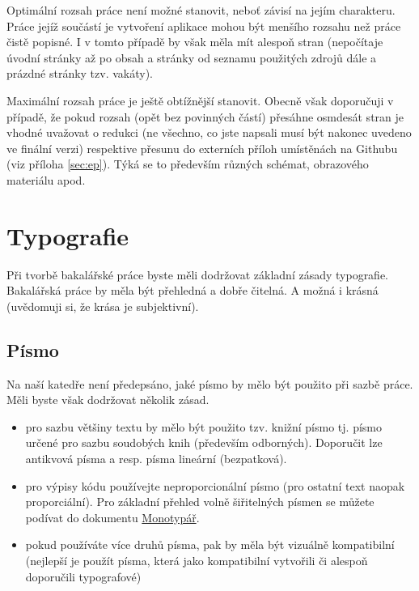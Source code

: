 \documentclass[male,czech,api_bc]{kitheses}
\begin{document}
Optimální rozsah  práce není možné stanovit, neboť závisí na jejím charakteru. Práce jejíž součástí je vytvoření aplikace mohou být menšího rozsahu než práce čistě popisné. I v tomto případě by však měla mít alespoň  stran (nepočítaje úvodní stránky až po obsah a stránky od seznamu použitých zdrojů dále a prázdné stránky tzv. vakáty).

Maximální rozsah práce je ještě obtížnější stanovit. Obecně však doporučuji v případě, že pokud rozsah (opět bez povinných částí) přesáhne osmdesát stran je vhodné uvažovat o redukci (ne všechno, co jste napsali musí být nakonec uvedeno ve finální verzi) respektive přesunu do externích příloh umístěnách na Githubu (viz příloha \vref{sec:ep}). Týká se to především různých schémat, obrazového materiálu apod.

\chapter{Typografie}

Při tvorbě bakalářské práce byste měli dodržovat základní zásady typografie. Bakalářská práce by měla být přehledná a dobře čitelná. A možná i krásná (uvědomuji si, že krása je subjektivní).

\section{Písmo}

Na naší katedře není předepsáno, jaké písmo by mělo být použito při sazbě práce. Měli byste však dodržovat několik zásad.

\begin{itemize}
\item pro sazbu většiny textu by mělo být použito tzv. knižní písmo tj. písmo určené
pro sazbu soudobých knih (především odborných). Doporučit lze antikvová písma a resp. písma lineární (bezpatková).
\item pro výpisy kódu používejte neproporcionální písmo (pro ostatní text naopak proporciální). Pro základní přehled 
volně šiřitelných písmen se můžete podívat do dokumentu \href{https://github.com/Jiri-Fiser/thesis_ki_ujep/blob/main/monotyp%C3%A1%C5%99.pdf}{Monotypář}.
\item pokud používáte více druhů písma, pak by měla být vizuálně kompatibilní (nejlepší je použít písma, která jako kompatibilní vytvořili či alespoň doporučili typografové)
\end{itemize}
\end{document}
